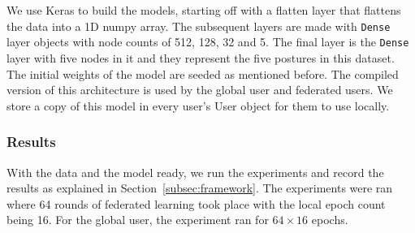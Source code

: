 \documentclass[12pt]{article}
\begin{document}
\noindent We use Keras to build the models, starting off with a flatten layer that flattens the data into a 1D numpy array. The subsequent layers are made with \texttt{Dense} layer objects with node counts of 512, 128, 32 and 5. The final layer is the \texttt{Dense} layer with five nodes in it and they represent the five postures in this dataset. The initial weights of the model are seeded as mentioned before. The compiled version of this architecture is used by the global user and federated users. We store a copy of this model in every user's User object for them to use locally.
\subsubsection{Results}
With the data and the model ready, we run the experiments and record the results as explained in Section~\ref{subsec:framework}. The experiments were ran where 64 rounds of federated learning took place with the local epoch count being 16. For the global user, the experiment ran for $64 \times 16$ epochs.
\end{document}
